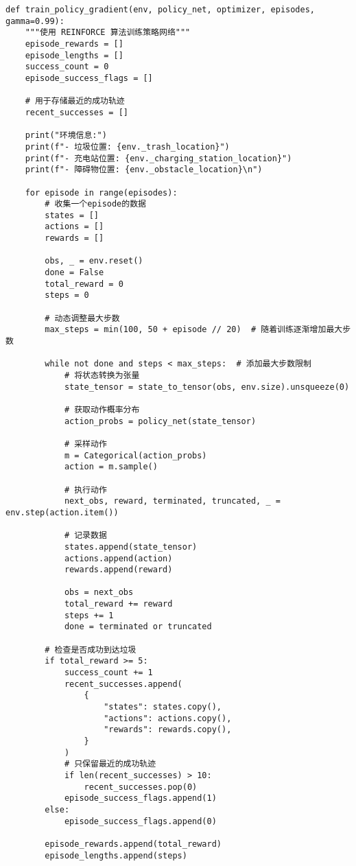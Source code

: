 \begin{verbatim}
def train_policy_gradient(env, policy_net, optimizer, episodes, gamma=0.99):
    """使用 REINFORCE 算法训练策略网络"""
    episode_rewards = []
    episode_lengths = []
    success_count = 0
    episode_success_flags = []

    # 用于存储最近的成功轨迹
    recent_successes = []

    print("环境信息:")
    print(f"- 垃圾位置: {env._trash_location}")
    print(f"- 充电站位置: {env._charging_station_location}")
    print(f"- 障碍物位置: {env._obstacle_location}\n")

    for episode in range(episodes):
        # 收集一个episode的数据
        states = []
        actions = []
        rewards = []

        obs, _ = env.reset()
        done = False
        total_reward = 0
        steps = 0

        # 动态调整最大步数
        max_steps = min(100, 50 + episode // 20)  # 随着训练逐渐增加最大步数

        while not done and steps < max_steps:  # 添加最大步数限制
            # 将状态转换为张量
            state_tensor = state_to_tensor(obs, env.size).unsqueeze(0)

            # 获取动作概率分布
            action_probs = policy_net(state_tensor)

            # 采样动作
            m = Categorical(action_probs)
            action = m.sample()

            # 执行动作
            next_obs, reward, terminated, truncated, _ = env.step(action.item())

            # 记录数据
            states.append(state_tensor)
            actions.append(action)
            rewards.append(reward)

            obs = next_obs
            total_reward += reward
            steps += 1
            done = terminated or truncated

        # 检查是否成功到达垃圾
        if total_reward >= 5:
            success_count += 1
            recent_successes.append(
                {
                    "states": states.copy(),
                    "actions": actions.copy(),
                    "rewards": rewards.copy(),
                }
            )
            # 只保留最近的成功轨迹
            if len(recent_successes) > 10:
                recent_successes.pop(0)
            episode_success_flags.append(1)
        else:
            episode_success_flags.append(0)

        episode_rewards.append(total_reward)
        episode_lengths.append(steps)


\end{verbatim}
